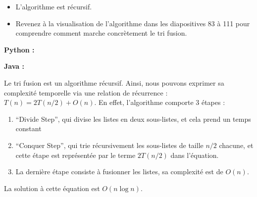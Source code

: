 \begin{Exercice} [30 minutes]
    \begin{conseil}
    \begin{itemize}
        \item L'algorithme est récursif. 
        \item Revenez à la visualisation de l'algorithme dans les diapositives 83 à 111 pour comprendre comment marche concrètement le tri fusion. 
    \end{itemize}
    
    \end{conseil}
    
    \begin{solution}
        \textbf{Python :}
         
    \end{solution}
    \begin{solution}
        \textbf{Java :}
        
    \end{solution}
    \begin{solution}
        
        
        Le tri fusion est un algorithme récursif. Ainsi, nous pouvons exprimer sa complexité temporelle via une relation de récurrence : $T(n) = 2T(n/2) + O(n)$. En effet, l'algorithme comporte 3 étapes :
        \begin{enumerate}
            \item ``Divide Step'', qui divise les listes en deux sous-listes, et cela prend un temps constant
            \item ``Conquer Step'', qui trie récursivement les sous-listes de taille $n/2$ chacune, et cette étape est représentée par le terme $2T(n/2)$ dans l'équation.
            \item La dernière étape consiste à fusionner les listes, sa complexité est de $O(n)$.
        \end{enumerate}
        La solution à cette équation est $O(n \log n)$.
    \end{solution}
\end{Exercice}


